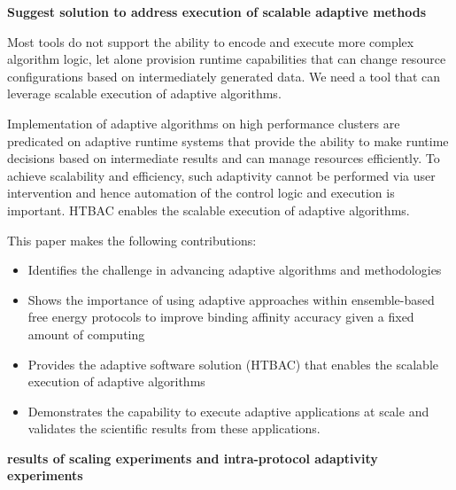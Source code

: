 \textbf{Suggest solution to address execution of scalable adaptive methods}

Most tools do not support the ability to encode and execute more complex 
algorithm logic, let alone provision runtime capabilities that can change 
resource configurations based on intermediately generated data.  
We need a tool that can leverage scalable execution of adaptive algorithms.

Implementation of adaptive algorithms on high performance clusters are 
predicated on adaptive runtime systems that provide the ability to make 
runtime decisions based on intermediate results and can manage resources 
efficiently. To achieve scalability and efficiency, such adaptivity cannot be 
performed via user intervention and hence automation of the control logic and 
execution is important. HTBAC enables the scalable execution of adaptive 
algorithms. 




This paper makes the following contributions:
\begin{itemize}
  \item Identifies the challenge in advancing adaptive algorithms and 
  methodologies
  \item Shows the importance of using adaptive approaches within ensemble-based
  free energy protocols to improve binding affinity accuracy given a fixed 
  amount of computing
  \item Provides the adaptive software solution (HTBAC) that enables the 
  scalable execution of adaptive algorithms
  \item Demonstrates the capability to execute adaptive applications at scale 
  and validates the scientific results from these applications.
\end{itemize}

\textbf{results of scaling experiments and intra-protocol adaptivity experiments}

